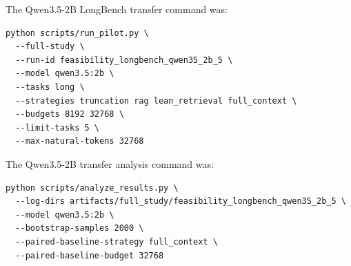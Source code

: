 \documentclass[11pt]{article}
\begin{document}
The Qwen3.5-2B LongBench transfer command was:
\begin{verbatim}
python scripts/run_pilot.py \
  --full-study \
  --run-id feasibility_longbench_qwen35_2b_5 \
  --model qwen3.5:2b \
  --tasks long \
  --strategies truncation rag lean_retrieval full_context \
  --budgets 8192 32768 \
  --limit-tasks 5 \
  --max-natural-tokens 32768
\end{verbatim}

The Qwen3.5-2B transfer analysis command was:
\begin{verbatim}
python scripts/analyze_results.py \
  --log-dirs artifacts/full_study/feasibility_longbench_qwen35_2b_5 \
  --model qwen3.5:2b \
  --bootstrap-samples 2000 \
  --paired-baseline-strategy full_context \
  --paired-baseline-budget 32768
\end{verbatim}



\end{document}
